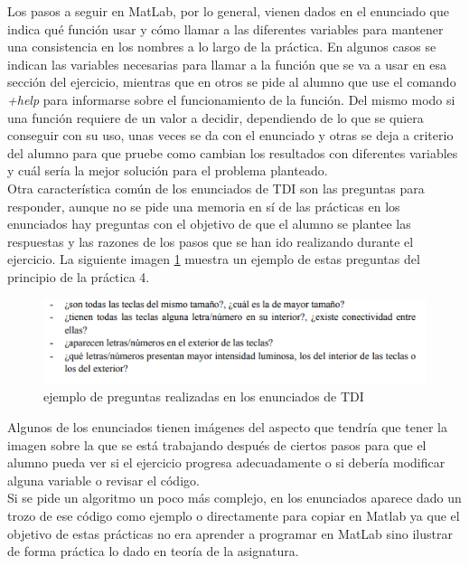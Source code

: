 \documentclass[a4paper,12pt]{report}
\begin{document}
Los pasos a seguir en MatLab, por lo general, vienen dados en el enunciado que indica qué función usar y cómo llamar a las diferentes variables para mantener una consistencia en los nombres a lo largo de la práctica. En algunos casos se indican las variables necesarias para llamar a la función que se va a usar en esa sección del ejercicio, mientras que en otros se pide al alumno que use el comando \textsl{+help} para informarse sobre el funcionamiento de la función. Del mismo modo si una función requiere de un valor a decidir, dependiendo de lo que se quiera conseguir con su uso, unas veces se da con el enunciado y otras se deja a criterio del alumno para que pruebe como cambian los resultados con diferentes variables y cuál sería la mejor solución para el problema planteado.\\

Otra característica común de los enunciados de TDI son las preguntas para responder, aunque no se pide una memoria en sí de las prácticas en los enunciados hay preguntas con el objetivo de que el alumno se plantee las respuestas y las razones de los pasos que se han ido realizando durante el ejercicio.  La siguiente imagen \ref{preguntasp4} muestra un ejemplo de estas preguntas del principio de la práctica 4.

\begin{figure}[h]
\centering
\includegraphics[width=1\textwidth]{imagenes/preguntasp4}
\caption{ejemplo de preguntas realizadas en los enunciados de TDI}
\label{preguntasp4}
\end{figure}

Algunos de los enunciados tienen imágenes del aspecto que tendría que tener la imagen sobre la que se está trabajando después de ciertos pasos para que el alumno pueda ver si el ejercicio progresa adecuadamente o si debería modificar alguna variable o revisar el código.\\

Si se pide un algoritmo un poco más complejo, en los enunciados aparece dado un trozo de ese código como ejemplo o directamente para copiar en Matlab ya que el objetivo de estas prácticas no era aprender a programar en MatLab sino ilustrar de forma práctica lo dado en teoría de la asignatura.\\
\end{document}
